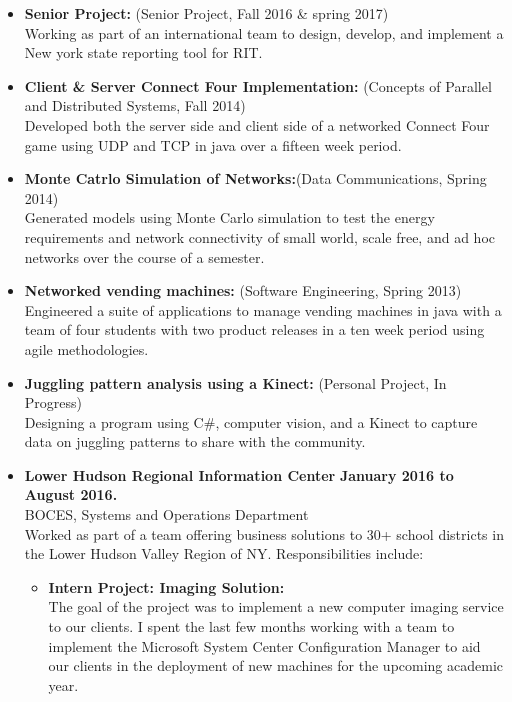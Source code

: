 \documentclass[10pt]{article}
\begin{document}
\begin{itemize}[topsep=1ex, itemsep=1ex, partopsep=0ex, parsep=.25ex]
		\item[] {\bf Senior Project:} (Senior Project, Fall 2016 \& spring 2017)\\
		Working as part of an international team to design, develop, and implement a New york state reporting tool for RIT.	
    	\item[] {\bf Client \& Server Connect Four Implementation:} (Concepts of Parallel and Distributed Systems, Fall 2014)\\
    	Developed both the server side and client side of a networked Connect Four game using UDP and TCP in java over a fifteen week period.
	\item[] {\bf Monte Catrlo Simulation of Networks:}(Data Communications, Spring 2014)\\
	Generated models using Monte Carlo simulation to test the energy requirements and network connectivity of small world, scale free, and ad hoc networks over the course of a semester.
	\item[] {\bf Networked vending machines:} (Software Engineering, Spring 2013)\\
	Engineered a suite of applications to manage vending machines in java with a team of four students with two product releases in a ten week period using agile methodologies.
	\item[] {\bf Juggling pattern analysis using a Kinect:} (Personal Project, In Progress)\\
    	Designing a program using C\#, computer vision, and a Kinect to capture data on juggling patterns to share with the community.
\end{itemize}
\vspace{.75ex}
\begin{itemize}[topsep=1ex, itemsep=1ex, partopsep=0ex, parsep=0ex]
	\item[] {{\bf Lower Hudson Regional Information Center} \hfill {\bf January 2016 to August 2016.}}\\
	BOCES, Systems and Operations Department\\
	Worked as part of a team offering business solutions to 30+ school districts in the Lower Hudson Valley Region of NY. Responsibilities include:
	\begin{itemize} [topsep=.5ex, itemsep=.25ex, partopsep=0ex, parsep=.5ex]
		\item[] {\bf Intern Project: Imaging Solution:}\\
		The goal of the project was to implement a new computer imaging service to our clients. I spent the last few months working with a team to implement the Microsoft System Center Configuration Manager to aid our clients in the deployment of new machines for the upcoming academic year. 
	\end{itemize}
\end{itemize}
\end{document}
